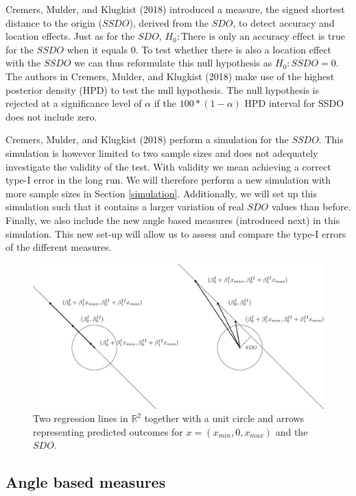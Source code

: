\documentclass[11pt,]{article}
\begin{document}
Cremers, Mulder, and Klugkist (2018) introduced a measure, the signed
shortest distance to the origin (\(SSDO\)), derived from the \(SDO\), to
detect accuracy and location effects. Just as for the \(SDO\),
\textit{$H_0: \text{There is only an
accuracy effect}$} is true for the \(SSDO\) when it equals 0. To test
whether there is also a location effect with the \(SSDO\) we can thus
reformulate this null hypothesis as \textit{$H_0: SSDO = 0$}. The
authors in Cremers, Mulder, and Klugkist (2018) make use of the highest
posterior density (HPD) to test the null hypothesis. The null hypothesis
is rejected at a significance level of \(\alpha\) if the
\(100*(1-\alpha)\) HPD interval for SSDO does not include zero.

Cremers, Mulder, and Klugkist (2018) perform a simulation for the
\(SSDO\). This simulation is however limited to two sample sizes and
does not adequately investigate the validity of the test. With validity
we mean achieving a correct type-I error in the long run. We will
therefore perform a new simulation with more sample sizes in Section
\ref{simulation}. Additionally, we will set up this simulation such that
it contains a larger variation of real \(SDO\) values than before.
Finally, we also include the new angle based measures (introduced next)
in this simulation. This new set-up will allow us to assess and compare
the type-I errors of the different measures.

\begin{figure}
\centering
\includegraphics{Plots/LocAcc.pdf}
\caption{Two regression lines in $\mathbb{R}^2$ together with a unit circle and arrows representing predicted outcomes for $x = (x_{min}, 0, x_{max})$ and the $SDO$.} 
\label{figLocAcc}
\end{figure}

\subsection{Angle based measures}\label{measure2}
\end{document}
